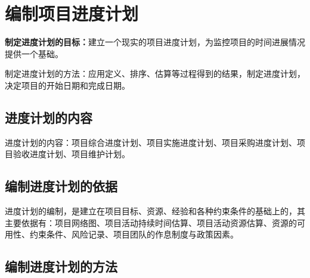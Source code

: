 \section{编制项目进度计划}
\textbf{制定进度计划的目标：}建立一个现实的项目进度计划，为监控项目的时间进展情况提供一个基础。
\par 制定进度计划的方法：应用定义、排序、估算等过程得到的结果，制定进度计划，决定项目的开始日期和完成日期。
\subsection{进度计划的内容}
进度计划的内容：项目综合进度计划、项目实施进度计划、项目采购进度计划、项目验收进度计划、项目维护计划。
\subsection{编制进度计划的依据}
进度计划的编制，是建立在项目目标、资源、经验和各种约束条件的基础上的，其主要依据有：项目网络图、项目活动持续时间估算、项目活动资源估算、资源的可用性、约束条件、风险记录、项目团队的作息制度与政策因素。
\subsection{编制进度计划的方法}
